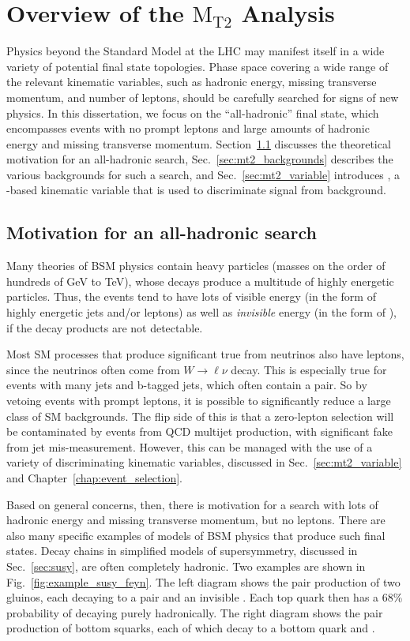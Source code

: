 \chapter{Overview of the \texorpdfstring{$\text{M}_\text{T2}$}{MT2} Analysis}

Physics beyond the Standard Model at the LHC may manifest itself in a wide variety of potential final state 
topologies. Phase space covering a wide range of the relevant kinematic variables, such as hadronic energy,
missing transverse momentum, and number of leptons, should be carefully searched for signs of new physics.
In this dissertation, we focus on the ``all-hadronic'' final state,
which encompasses events with no prompt leptons and large amounts of hadronic energy and missing transverse momentum.
Section~\ref{sec:motivation} discusses the theoretical motivation for an all-hadronic search, Sec.~\ref{sec:mt2_backgrounds}
describes the various backgrounds for such a search, and Sec.~\ref{sec:mt2_variable} introduces \mttwo, a \ptmiss-based kinematic
variable that is used to discriminate signal from background.

\section{Motivation for an all-hadronic search}
\label{sec:motivation}

Many theories of BSM physics contain heavy particles (masses on the order of hundreds of GeV to TeV), whose
decays produce a multitude of highly energetic particles. Thus, the events tend to have lots of visible
energy (in the form of highly energetic jets and/or leptons) as well as
\emph{invisible} energy (in the form of \ptmiss), if the decay products are not detectable.

Most SM processes that produce significant true \ptmiss from neutrinos also have leptons, since the
neutrinos often come from $W\to\ell\nu$ decay. This is especially true for events with many jets
and b-tagged jets, which often contain a \ttbar pair. So by vetoing events with prompt leptons, it is
possible to significantly reduce a large class of SM backgrounds. The flip side of this is that a
zero-lepton selection will be contaminated by events from QCD multijet production, with significant
fake \ptmiss from jet mis-measurement. However, this can be managed with the use of a variety of
discriminating kinematic variables, discussed in Sec.~\ref{sec:mt2_variable} and Chapter~\ref{chap:event_selection}.

Based on general concerns, then, there is motivation for a search with lots of hadronic energy and
missing transverse momentum, but no leptons. There are also many specific examples of models
of BSM physics that produce such final states. Decay chains in simplified models of supersymmetry, discussed in
Sec.~\ref{sec:susy}, are often completely hadronic. Two examples are shown in Fig.~\ref{fig:example_susy_feyn}.
The left diagram shows the pair production of two gluinos, each decaying to a \ttbar pair and an invisible \lsp.
Each top quark then has a 68\% probability of decaying purely hadronically. The right diagram shows
the pair production of bottom squarks, each of which decay to a bottom quark and \lsp.

